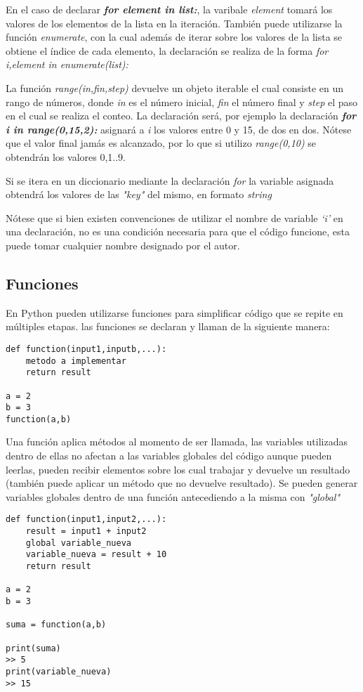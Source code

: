 \documentclass[10pt,a4paper]{article}
\begin{document}
\begin{description}[labelsep=0.5cm, itemindent=0cm]

\item [list]
En el caso de declarar \textbf{\emph{for element in list:}}, la varibale \emph{element} tomará los valores de los elementos de la lista en la iteración. También puede utilizarse la función \emph{enumerate}, con la cual además de iterar sobre los valores de la lista se obtiene el índice de cada elemento, la declaración se realiza de la forma \emph{for i,element in enumerate(list):}  
\item [range(in,fin,step)]
La función \emph{range(in,fin,step)} devuelve un objeto iterable el cual consiste en un rango de números, donde \emph{in} es el número inicial, \emph{fin} el número final y \emph{step} el paso en el cual se realiza el conteo. La declaración será, por ejemplo la declaración \textbf{\emph{for i in range(0,15,2):}} asignará a \emph{i} los valores entre 0 y 15, de dos en dos. Nótese que el valor final jamás es alcanzado, por lo que si utilizo \emph{range(0,10)} se obtendrán los valores 0,1..9.
\item [dictionary]
Si se itera en un diccionario mediante la declaración \emph{for} la variable asignada obtendrá los valores de las \emph{"key"} del mismo, en formato \emph{string}
\end{description}
\noindent Nótese que si bien existen convenciones de utilizar el nombre de variable \emph{`i'} en una declaración, no es una condición necesaria para que el código funcione, esta puede tomar cualquier nombre designado por el autor.
\subsection{Funciones}
En Python pueden utilizarse funciones para simplificar código que se repite en múltiples etapas. las funciones se declaran y llaman de la siguiente manera:
\begin{lstlisting}
def function(input1,inputb,...):
    metodo a implementar
    return result

a = 2
b = 3
function(a,b)
\end{lstlisting} 
\noindent Una función aplica métodos al momento de ser llamada, las variables utilizadas dentro de ellas no afectan a las variables globales del código aunque pueden leerlas, pueden recibir elementos sobre los cual trabajar y devuelve un resultado (también puede aplicar un método que no devuelve resultado). Se pueden generar variables globales dentro de una función antecediendo a la misma con \emph{"global"}
\begin{lstlisting}
def function(input1,input2,...):
    result = input1 + input2
    global variable_nueva
    variable_nueva = result + 10    
    return result

a = 2
b = 3

suma = function(a,b)

print(suma)
>> 5
print(variable_nueva)
>> 15
\end{lstlisting} 
\end{document}
